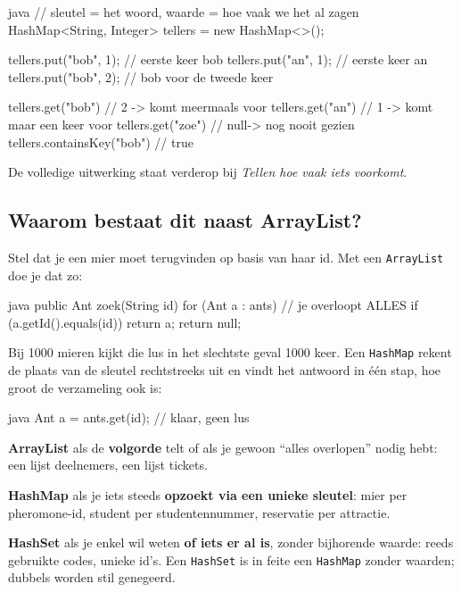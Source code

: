 \documentclass[a4paper,11pt]{article}
\begin{document}
\begin{codeblock}{java}
    // sleutel = het woord, waarde = hoe vaak we het al zagen
    HashMap<String, Integer> tellers = new HashMap<>();

    tellers.put("bob", 1);   // eerste keer bob
    tellers.put("an", 1);    // eerste keer an
    tellers.put("bob", 2);   // bob voor de tweede keer

    tellers.get("bob")            // 2   -> komt meermaals voor
    tellers.get("an")             // 1   -> komt maar een keer voor
    tellers.get("zoe")            // null-> nog nooit gezien
    tellers.containsKey("bob")    // true
\end{codeblock}

De volledige uitwerking staat verderop bij \textit{Tellen hoe vaak iets
    voorkomt}.

\subsection{Waarom bestaat dit naast ArrayList?}

Stel dat je een mier moet terugvinden op basis van haar id. Met een
\texttt{ArrayList} doe je dat zo:

\begin{codeblock}{java}
    public Ant zoek(String id) {
            for (Ant a : ants) {                    // je overloopt ALLES
                    if (a.getId().equals(id)) { return a; }
                }
            return null;
        }
\end{codeblock}

Bij 1000 mieren kijkt die lus in het slechtste geval 1000 keer. Een
\texttt{HashMap} rekent de plaats van de sleutel rechtstreeks uit en vindt het
antwoord in \'e\'en stap, hoe groot de verzameling ook is:

\begin{codeblock}{java}
    Ant a = ants.get(id);   // klaar, geen lus
\end{codeblock}

\begin{conceptbox}
    \textbf{ArrayList} als de \textbf{volgorde} telt of als je gewoon ``alles
    overlopen'' nodig hebt: een lijst deelnemers, een lijst tickets.

    \medskip
    \textbf{HashMap} als je iets steeds \textbf{opzoekt via een unieke sleutel}:
    mier per pheromone-id, student per studentennummer, reservatie per attractie.

    \medskip
    \textbf{HashSet} als je enkel wil weten \textbf{of iets er al is}, zonder
    bijhorende waarde: reeds gebruikte codes, unieke id's. Een \texttt{HashSet} is in
    feite een \texttt{HashMap} zonder waarden; dubbels worden stil genegeerd.
\end{conceptbox}
\end{document}
